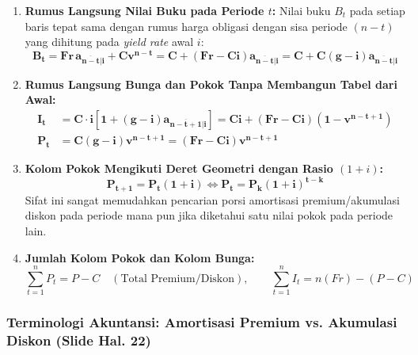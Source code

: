 \documentclass[11pt,a4paper]{article}
\begin{document}
\begin{theorembox}
\begin{enumerate}[label=\textbf{\arabic*.}]
    \item \textbf{Rumus Langsung Nilai Buku pada Periode $t$:}
    Nilai buku $B_t$ pada setiap baris tepat sama dengan rumus harga obligasi dengan sisa periode $(n-t)$ yang dihitung pada \textit{yield rate} awal $i$:
    \begin{equation}
        \mathbf{B_t = Fr \, a_{\overline{n-t}|i} + C v^{n-t} = C + (Fr - Ci) a_{\overline{n-t}|i} = C + C(g - i) a_{\overline{n-t}|i}}
    \end{equation}
    \item \textbf{Rumus Langsung Bunga dan Pokok Tanpa Membangun Tabel dari Awal:}
    \begin{align}
        \mathbf{I_t} &= \mathbf{C \cdot i \left[ 1 + (g - i) a_{\overline{n-t+1}|i} \right] = Ci + (Fr - Ci)(1 - v^{n-t+1})} \\
        \mathbf{P_t} &= \mathbf{C(g - i) v^{n-t+1} = (Fr - Ci) v^{n-t+1}}
    \end{align}
    \item \textbf{Kolom Pokok Mengikuti Deret Geometri dengan Rasio $(1+i)$:}
    \begin{equation}
        \mathbf{P_{t+1} = P_t (1+i)} \iff \mathbf{P_t = P_k (1+i)^{t-k}}
    \end{equation}
    Sifat ini sangat memudahkan pencarian porsi amortisasi premium/akumulasi diskon pada periode mana pun jika diketahui satu nilai pokok pada periode lain.
    \item \textbf{Jumlah Kolom Pokok dan Kolom Bunga:}
    \begin{equation}
        \sum_{t=1}^n P_t = P - C \quad (\text{Total Premium/Diskon}), \qquad \sum_{t=1}^n I_t = n(Fr) - (P - C)
    \end{equation}
\end{enumerate}
\end{theorembox}

\subsubsection{Terminologi Akuntansi: Amortisasi Premium vs. Akumulasi Diskon (Slide Hal. 22)}
\end{document}
